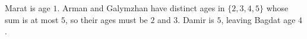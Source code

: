 Marat is age $1$. Arman and Galymzhan have distinct ages in $\{2,3,4,5\}$ whose sum is at most $5$, so their ages must be $2$ and $3$. Damir is $5$, leaving Bagdat age $\boxed4$.
